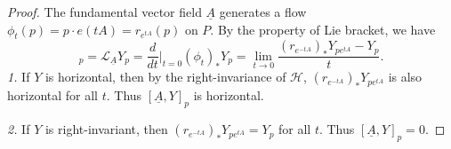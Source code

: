 \begin{proof}
    The fundamental vector field $\underline{A}$ generates a flow $\phi_t(p) = p\cdot e(tA) = r_{e^{tA}}(p)$ on $P$. 
    By the property of Lie bracket, we have
    \begin{equation*}
        [\underline{A}, Y]_p = \mathcal{L}_{\underline{A}}Y_p = \frac{d}{dt}\Big|_{t=0}(\phi_t)_*Y_p 
        = \lim_{t\to 0}\frac{(r_{e^{-tA}})_*Y_{p e^{tA}} - Y_p}{t}.
    \end{equation*}
    \textit{1.} If $Y$ is horizontal, then by the right-invariance of $\mathcal{H}$, 
    $(r_{e^{-tA}})_*Y_{p e^{tA}}$ is also horizontal for all $t$. Thus $[\underline{A}, Y]_p$ is horizontal.

    \noindent\textit{2.} If $Y$ is right-invariant, then $(r_{e^{-tA}})_*Y_{p e^{tA}} = Y_p$ for all $t$. Thus $[\underline{A}, Y]_p = 0$.
\end{proof}
